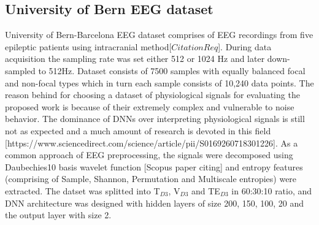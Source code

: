 \documentclass{article}
\begin{document}
\subsection{University of Bern EEG dataset}
University of Bern-Barcelona EEG dataset comprises of EEG recordings from five epileptic patients using intracranial method[$CitationReq$]. During data acquisition the sampling rate was set either 512 or 1024 Hz and later down-sampled to 512Hz. Dataset consists of 7500 samples with equally balanced focal and non-focal types which in turn each sample consists of 10,240 data points. The reason behind for choosing a dataset of physiological signals for evaluating the proposed work is because of their extremely complex and vulnerable to noise behavior.  
The dominance of DNNs over interpreting physiological signals is still not as expected and a much amount of research is devoted in this field [https://www.sciencedirect.com/science/article/pii/S0169260718301226]. As a common approach of EEG preprocessing, the signals were decomposed using Daubechies10 basis wavelet function [Scopus paper citing]  and entropy features (comprising of Sample, Shannon, Permutation and Multiscale entropies) were extracted. The datset was splitted into T$_{D3}$, V$_{D3}$ and TE$_{D3}$ in 60:30:10 ratio, and DNN architecture was designed with hidden layers of size 200, 150, 100, 20 and the output layer with size 2.
\end{document}
